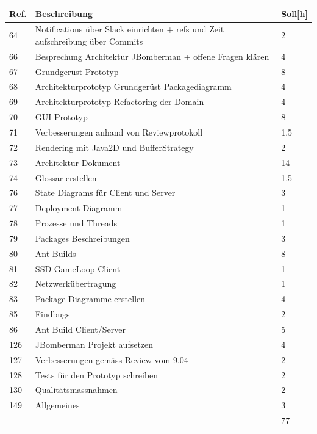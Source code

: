 \documentclass[11pt]{scrartcl}
\begin{document}
  \begin{tabularx} {\linewidth}{lXl}
    \bf{Ref.}  & \bf{Beschreibung} & \bf{Soll[h]} \\
    \hline
    64 & Notifications über Slack einrichten + refs und Zeit aufschreibung über Commits & 2 \\
    66 & Besprechung Architektur JBomberman + offene Fragen klären & 4 \\
    67 &  Grundgerüst Prototyp & 8 \\
    68 & Architekturprototyp Grundgerüst Packagediagramm & 4 \\
    69 &  Architekturprototyp Refactoring der Domain & 4 \\
    70 & GUI Prototyp & 8\\
    71 & 	Verbesserungen anhand von Reviewprotokoll & 1.5\\
    72 & Rendering mit Java2D und BufferStrategy & 2 \\
    73 & Architektur Dokument & 14 \\
    74 & Glossar erstellen  & 1.5 \\
    76 & State Diagrams für Client und Server & 3 \\
    77 & Deployment Diagramm & 1\\
    78 & 	Prozesse und Threads & 1 \\
    79 & 	Packages Beschreibungen & 3 \\
    80 & Ant Builds & 8 \\
    81 & SSD GameLoop Client & 1 \\
    82 & Netzwerkübertragung & 1 \\
    83 & Package Diagramme erstellen & 4 \\
    85 & 	Findbugs & 2 \\
    86 & Ant Build Client/Server & 5 \\
    126 & JBomberman Projekt aufsetzen & 4 \\
    127 & Verbesserungen gemäss Review vom 9.04 & 2 \\
    128 & Tests für den Prototyp schreiben & 2 \\
    130 & Qualitätsmassnahmen	& 2 \\
    149 & Allgemeines & 3 \\
    \hline
    & & 77
  \end{tabularx}
  
\end{document}
